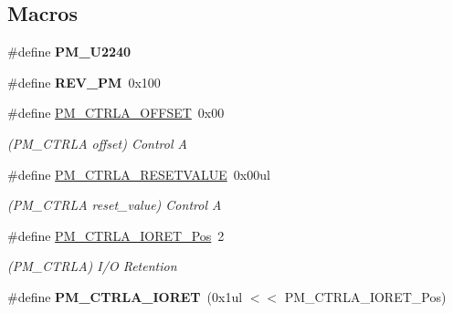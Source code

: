 \subsection*{Macros}
\begin{DoxyCompactItemize}
\item 
\hypertarget{group___s_a_m_l21___p_m_ga9f3dcd9219beb814a9544d8d0428819b}{}\#define {\bfseries P\+M\+\_\+\+U2240}\label{group___s_a_m_l21___p_m_ga9f3dcd9219beb814a9544d8d0428819b}

\item 
\hypertarget{group___s_a_m_l21___p_m_ga575500b9d7813503f74cc639dac37705}{}\#define {\bfseries R\+E\+V\+\_\+\+P\+M}~0x100\label{group___s_a_m_l21___p_m_ga575500b9d7813503f74cc639dac37705}

\item 
\hypertarget{group___s_a_m_l21___p_m_gac47de8c1c1280430ce8873f9ef37e6f3}{}\#define \hyperlink{group___s_a_m_l21___p_m_gac47de8c1c1280430ce8873f9ef37e6f3}{P\+M\+\_\+\+C\+T\+R\+L\+A\+\_\+\+O\+F\+F\+S\+E\+T}~0x00\label{group___s_a_m_l21___p_m_gac47de8c1c1280430ce8873f9ef37e6f3}

\begin{DoxyCompactList}\small\item\em (P\+M\+\_\+\+C\+T\+R\+L\+A offset) Control A \end{DoxyCompactList}\item 
\hypertarget{group___s_a_m_l21___p_m_ga78f1f5bb930dafe9d37737015e35f096}{}\#define \hyperlink{group___s_a_m_l21___p_m_ga78f1f5bb930dafe9d37737015e35f096}{P\+M\+\_\+\+C\+T\+R\+L\+A\+\_\+\+R\+E\+S\+E\+T\+V\+A\+L\+U\+E}~0x00ul\label{group___s_a_m_l21___p_m_ga78f1f5bb930dafe9d37737015e35f096}

\begin{DoxyCompactList}\small\item\em (P\+M\+\_\+\+C\+T\+R\+L\+A reset\+\_\+value) Control A \end{DoxyCompactList}\item 
\hypertarget{group___s_a_m_l21___p_m_gad2bf677585d69908c39a132d5c978166}{}\#define \hyperlink{group___s_a_m_l21___p_m_gad2bf677585d69908c39a132d5c978166}{P\+M\+\_\+\+C\+T\+R\+L\+A\+\_\+\+I\+O\+R\+E\+T\+\_\+\+Pos}~2\label{group___s_a_m_l21___p_m_gad2bf677585d69908c39a132d5c978166}

\begin{DoxyCompactList}\small\item\em (P\+M\+\_\+\+C\+T\+R\+L\+A) I/\+O Retention \end{DoxyCompactList}\item 
\hypertarget{group___s_a_m_l21___p_m_ga599ca1dad03f9b64d5c01e1db9669825}{}\#define {\bfseries P\+M\+\_\+\+C\+T\+R\+L\+A\+\_\+\+I\+O\+R\+E\+T}~(0x1ul $<$$<$ P\+M\+\_\+\+C\+T\+R\+L\+A\+\_\+\+I\+O\+R\+E\+T\+\_\+\+Pos)\label{group___s_a_m_l21___p_m_ga599ca1dad03f9b64d5c01e1db9669825}


\end{DoxyCompactItemize}
